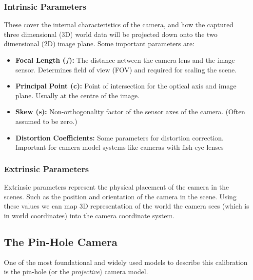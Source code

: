 \subsubsection{Intrinsic Parameters}
\label{subsubsec:intrinsic}

These cover the internal characteristics of the camera, and how the captured three dimensional (3D) world data will be projected down onto the two dimensional (2D) image plane.
Some important parameters are:

\begin{itemize}
  \item \textbf{Focal Length ($f$):} The distance netween the camera lens and the image sensor. Determines field of view (FOV) and required for scaling the scene.
  \item \textbf{Principal Point (c):} Point of intersection for the optical axis and image plane. Usually at the centre of the image.
  \item \textbf{Skew (s):} Non-orthogonality factor of the sensor axes of the camera. (Often assumed to be zero.)
  \item \textbf{Distortion Coefficients:} Some parameters for distortion correction. Important for camera model systems like cameras with fish-eye lenses \cite{king1989history}
\end{itemize}


\subsubsection{Extrinsic Parameters}
Extrinsic parameters represent the physical placement of the camera in the scenes. Such as the position and orientation of the camera in the scene. Using these values we can map  3D representation of the world the camera sees (which is in world coordinates) into the camera coordinate system.
\\

\subsection {The Pin-Hole Camera}
One of the most foundational and widely used models to describe this calibration is the pin-hole (or the  \emph{projective}) camera model. 


